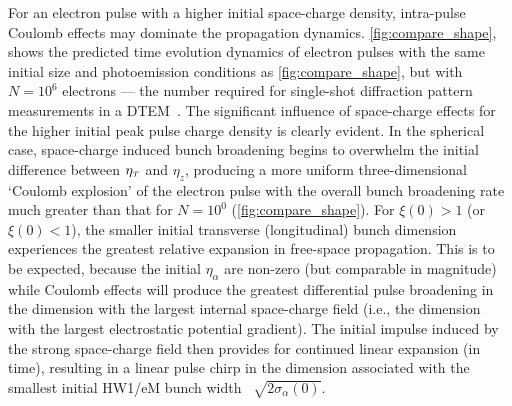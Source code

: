 For an electron pulse with a higher initial space-charge density, intra-pulse Coulomb effects may dominate the propagation dynamics.
\ref{fig:compare_shape}, shows the predicted time evolution dynamics of electron pulses with the same initial size and photoemission conditions as \ref{fig:compare_shape}, but with $ N = 10^{6} $ electrons --- the number required for single-shot diffraction pattern measurements in a DTEM~\cite{berger_dc_2009,armstrong_practical_2007}.
The significant influence of space-charge effects for the higher initial peak pulse charge density is clearly evident.
In the spherical case, space-charge induced bunch broadening begins to overwhelm the initial difference between $\eta_{{\scriptscriptstyle T}}$ and $\eta_{z}$, producing a more uniform three-dimensional `Coulomb explosion' of the electron pulse with the overall bunch broadening rate much greater than that for $ N = 10^{0} $ (\ref{fig:compare_shape}).
For $ \xi (0) > 1 $ (or $ \xi (0) < 1 $), the smaller initial transverse (longitudinal) bunch dimension experiences the greatest relative expansion in free-space propagation. This is to be expected, because the initial $\eta_{\alpha}$ are non-zero (but comparable in magnitude) while Coulomb effects will produce the greatest differential pulse broadening in the dimension with the largest internal space-charge field (i.e., the dimension with the largest electrostatic potential gradient).
The initial impulse induced by the strong space-charge field then provides for continued linear expansion (in time), resulting in a linear pulse chirp in the dimension associated with the smallest initial HW1/eM bunch width~\cite{michalik_analytic_2006,berger_dc_2009} $ \sqrt{ 2 \sigma_{\alpha} (0) } $.


